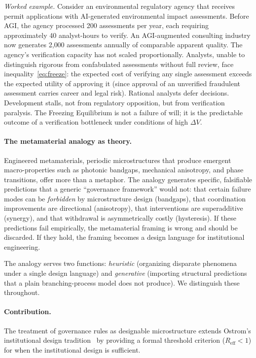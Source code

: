 \documentclass[runningheads]{llncs}
\begin{document}
\emph{Worked example.} Consider an environmental regulatory agency that receives permit applications with AI-generated environmental impact assessments. Before AGI, the agency processed 200 assessments per year, each requiring approximately 40 analyst-hours to verify. An AGI-augmented consulting industry now generates 2{,}000 assessments annually of comparable apparent quality. The agency's verification capacity has not scaled proportionally. Analysts, unable to distinguish rigorous from confabulated assessments without full review, face inequality~\eqref{eq:freeze}: the expected cost of verifying any single assessment exceeds the expected utility of approving it (since approval of an unverified fraudulent assessment carries career and legal risk). Rational analysts defer decisions. Development stalls, not from regulatory opposition, but from verification paralysis. The Freezing Equilibrium is not a failure of will; it is the predictable outcome of a verification bottleneck under conditions of high $\Delta V$.

\paragraph{The metamaterial analogy as theory.}
Engineered metamaterials, periodic microstructures that produce emergent macro-properties such as photonic bandgaps, mechanical anisotropy, and phase transitions, offer more than a metaphor. The analogy generates specific, falsifiable predictions that a generic ``governance framework'' would not: that certain failure modes can be \emph{forbidden} by microstructure design (bandgaps), that coordination improvements are directional (anisotropy), that interventions are superadditive (synergy), and that withdrawal is asymmetrically costly (hysteresis). If these predictions fail empirically, the metamaterial framing is wrong and should be discarded. If they hold, the framing becomes a design language for institutional engineering.

The analogy serves two functions: \emph{heuristic} (organizing disparate phenomena under a single design language) and \emph{generative} (importing structural predictions that a plain branching-process model does not produce). We distinguish these throughout.

\paragraph{Contribution.}
The treatment of governance rules as designable microstructure extends Ostrom's institutional design tradition~\cite{ostrom1990governing} by providing a formal threshold criterion ($R_{\mathrm{eff}} < 1$) for when the institutional design is sufficient.
\end{document}
